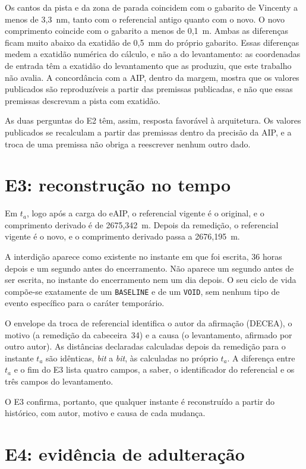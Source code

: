 Os cantos da pista e da zona de parada coincidem com o gabarito de Vincenty a menos de 3,3~nm, tanto com o referencial antigo quanto com o novo. O novo comprimento coincide com o gabarito a menos de 0,1~\textmu m. Ambas as diferenças ficam muito abaixo da exatidão de 0,5~mm do próprio gabarito. Essas diferenças medem a exatidão numérica do cálculo, e não a do levantamento: as coordenadas de entrada têm a exatidão do levantamento que as produziu, que este trabalho não avalia. A concordância com a AIP, dentro da margem, mostra que os valores publicados são reproduzíveis a partir das premissas publicadas, e não que essas premissas descrevam a pista com exatidão.

As duas perguntas do E2 têm, assim, resposta favorável à arquitetura. Os valores publicados se recalculam a partir das premissas dentro da precisão da AIP, e a troca de uma premissa não obriga a reescrever nenhum outro dado.

\section{E3: reconstrução no tempo}\label{sec:res-e3}

Em $t_a$, logo após a carga do eAIP, o referencial vigente é o original, e o comprimento derivado é de 2675,342~m. Depois da remedição, o referencial vigente é o novo, e o comprimento derivado passa a 2676,195~m.

A interdição aparece como existente no instante em que foi escrita, 36 horas depois e um segundo antes do encerramento. Não aparece um segundo antes de ser escrita, no instante do encerramento nem um dia depois. O seu ciclo de vida compõe-se exatamente de um \texttt{BASELINE} e de um \texttt{VOID}, sem nenhum tipo de evento específico para o caráter temporário.

O envelope da troca de referencial identifica o autor da afirmação (DECEA), o motivo (a remedição da cabeceira~34) e a causa (o levantamento, afirmado por outro autor). As distâncias declaradas calculadas depois da remedição para o instante $t_a$ são idênticas, \textit{bit} a \textit{bit}, às calculadas no próprio $t_a$. A diferença entre $t_a$ e o fim do E3 lista quatro campos, a saber, o identificador do referencial e os três campos do levantamento.

O E3 confirma, portanto, que qualquer instante é reconstruído a partir do histórico, com autor, motivo e causa de cada mudança.

\section{E4: evidência de adulteração}\label{sec:res-e4}

